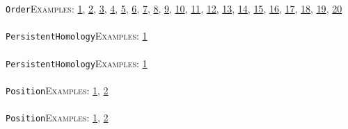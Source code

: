 \documentclass[a4paper,11pt]{report}
\begin{document}
{{ \texttt{Order}{\nobreakspace}{\nobreakspace}{\nobreakspace}{\nobreakspace}\textsc{Examples:} \href{tutorial/chap3.html} {1}{\nobreakspace}, \href{tutorial/chap6.html} {2}{\nobreakspace}, \href{../www/SideLinks/About/aboutAbelianCategories.html} {3}{\nobreakspace}, \href{../www/SideLinks/About/aboutNonabelian.html} {4}{\nobreakspace}, \href{../www/SideLinks/About/aboutPeriodic.html} {5}{\nobreakspace}, \href{../www/SideLinks/About/aboutCohomologyRings.html} {6}{\nobreakspace}, \href{../www/SideLinks/About/aboutPoincareSeries.html} {7}{\nobreakspace}, \href{../www/SideLinks/About/aboutCoveringSpaces.html} {8}{\nobreakspace}, \href{../www/SideLinks/About/aboutCoverinSpaces.html} {9}{\nobreakspace}, \href{../www/SideLinks/About/aboutPolytopes.html} {10}{\nobreakspace}, \href{../www/SideLinks/About/aboutQuandles.html} {11}{\nobreakspace}, \href{../www/SideLinks/About/aboutCrossedMods.html} {12}{\nobreakspace}, \href{../www/SideLinks/About/aboutquasi.html} {13}{\nobreakspace}, \href{../www/SideLinks/About/aboutSchurMultiplier.html} {14}{\nobreakspace}, \href{../www/SideLinks/About/aboutSimplicialGroups.html} {15}{\nobreakspace}, \href{../www/SideLinks/About/aboutExtensions.html} {16}{\nobreakspace}, \href{../www/SideLinks/About/aboutSpaceGroup.html} {17}{\nobreakspace}, \href{../www/SideLinks/About/aboutSuperperfect.html} {18}{\nobreakspace}, \href{../www/SideLinks/About/aboutGouter.html} {19}{\nobreakspace}, \href{../www/SideLinks/About/aboutTensorSquare.html} {20}{\nobreakspace} \\
 \\
 \texttt{PersistentHomology}{\nobreakspace}{\nobreakspace}{\nobreakspace}{\nobreakspace}\textsc{Examples:} \href{../www/SideLinks/About/aboutPersistent.html} {1}{\nobreakspace} \\
 \\
 \texttt{PersistentHomology}{\nobreakspace}{\nobreakspace}{\nobreakspace}{\nobreakspace}\textsc{Examples:} \href{../www/SideLinks/About/aboutPersistent.html} {1}{\nobreakspace} \\
 \\
 \texttt{Position}{\nobreakspace}{\nobreakspace}{\nobreakspace}{\nobreakspace}\textsc{Examples:} \href{tutorial/chap4.html} {1}{\nobreakspace}, \href{../www/SideLinks/About/aboutTensorSquare.html} {2}{\nobreakspace} \\
 \\
 \texttt{Position}{\nobreakspace}{\nobreakspace}{\nobreakspace}{\nobreakspace}\textsc{Examples:} \href{tutorial/chap4.html} {1}{\nobreakspace}, \href{../www/SideLinks/About/aboutTensorSquare.html} {2}{\nobreakspace} \\
}}
\end{document}
